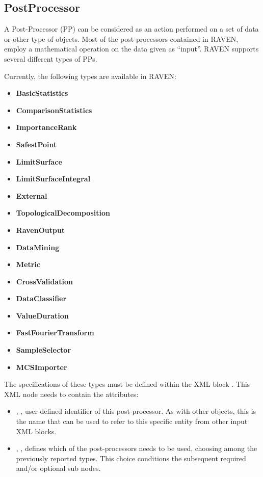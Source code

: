 \subsection{PostProcessor}
\label{sec:models_postProcessor}
A Post-Processor (PP) can be considered as an action performed on a set of data
or other type of objects.
%
Most of the post-processors contained in RAVEN, employ a mathematical operation
on the data given as ``input''.
%
RAVEN supports several different types of PPs.

Currently, the following types are available in RAVEN:
\begin{itemize}
  \itemsep0em
  \item \textbf{BasicStatistics}
  \item \textbf{ComparisonStatistics}
  \item \textbf{ImportanceRank}
  \item \textbf{SafestPoint}
  \item \textbf{LimitSurface}
  \item \textbf{LimitSurfaceIntegral}
  \item \textbf{External}
  \item \textbf{TopologicalDecomposition}
  \item \textbf{RavenOutput}
  \item \textbf{DataMining}
  \item \textbf{Metric}
  \item \textbf{CrossValidation}
  \item \textbf{DataClassifier}
  \item \textbf{ValueDuration}
  \item \textbf{FastFourierTransform}
  \item \textbf{SampleSelector}
  \item \textbf{MCSImporter}
\end{itemize}

The specifications of these types must be defined within the XML block
.
%
This XML node needs to contain the attributes:
\vspace{-5mm}
\begin{itemize}
  \itemsep0em
  \item {}, , user-defined
  identifier of this post-processor.
  \nb As with other objects, this is the name that can be used to refer to this
  specific entity from other input XML blocks.
  \item {}, , defines which of
  the post-processors needs to be used, choosing among the previously reported
  types.
  This choice conditions the subsequent required and/or optional
   sub nodes.
\end{itemize}
\vspace{-5mm}

